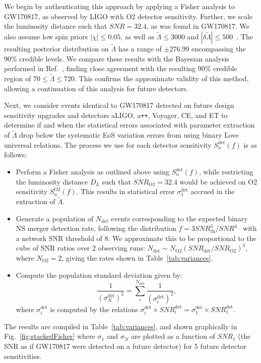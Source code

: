 \documentclass[prd,twocolumn,nofootinbib,superscriptaddress,amsmath,amssymb]{revtex4-1}
\begin{document}
We begin by authenticating this approach by applying a Fisher analysis to GW170817, as observed by LIGO with O2 detector sensitivity.
Further, we scale the luminosity distance such that $SNR=32.4$, as was found in GW170817.
We also assume low spin priors $|\chi| \leq 0.05$, as well as $\tilde{\Lambda} \leq 3000$ and $|\delta \tilde{\Lambda}| \leq 500$~\cite{Wade:LambdaPriors}.
The resulting posterior distribution on $\tilde{\Lambda}$ has a range of $\pm 276.99$ encompassing the $90\%$ credible levels.
We compare these results with the Bayesian analysis performed in Ref.~\cite{TheLIGOScientific:2017qsa,Abbott2018}, finding close agreement with the resulting $90\%$ credible region of $70 \leq \tilde{\Lambda} \leq 720$.
This confirms the approximate validity of this method, allowing a continuation of this analysis for future detectors.

Next, we consider events identical to GW170817 detected on future design sensitivity upgrades and detectors aLIGO, a\texttt{++}, Voyager, CE, and ET to determine if and when the statistical errors associated with parameter extraction of $\tilde{\Lambda}$ drop below the systematic EoS variation errors from using binary Love universal relations.
The process we use for each detector sensitivity $S_n^{\text{det}}(f)$ is as follows:
\begin{itemize}
\item Perform a Fisher analysis as outlined above using $S_n^{\text{det}}(f)$, while restricting the luminosity distance $D_L$ such that $SNR_{\text{O2}}=32.4$ would be achieved on O2 sensitivity $S_n^{\text{O2}}(f)$.
This results in statistical error $\sigma_1^{\text{det}}$ accrued in the extraction of $\tilde{\Lambda}$.
\item Generate a population of $N_{\text{det}}$ events corresponding to the expected binary NS merger detection rate, following the distribution $f=3 SNR_{\text{th}}^3/SNR^4$~\cite{Shutz:SNR,Chen:SNR} with a network SNR threshold of 8.
We approximate this to be proportional to the cube of SNR ratios over 2 observing runs: $N_{\text{det}} \sim N_{\text{O2}} (SNR_{\text{det}}/SNR_{\text{O2}})^3$, where $N_{\text{O2}}=2$, giving the rates shown in Table~\ref{tab:variances}.
\item Compute the population standard deviation given by:
\begin{equation}
\frac{1}{(\sigma_N^{\text{det}})^2}=\sum_i^{N_{\text{det}}}\frac{1}{(\sigma_i^{\text{det}})^2},
\end{equation}
where $\sigma_i^{\text{det}}$ is computed by the relations $\sigma_i^{\text{det}} \times SNR_i^{\text{det}} = \sigma_1^{\text{det}} \times SNR_1^{\text{det}}$.
\end{itemize}
The results are compiled in Table~\ref{tab:variances}, and shown graphically in Fig.~\ref{fig:stackedFisher} where $\sigma_1$ and $\sigma_N$ are plotted as a function of $SNR_1$ (the SNR as if GW170817 were detected on a future detector) for 5 future detector sensitivities.
\end{document}
